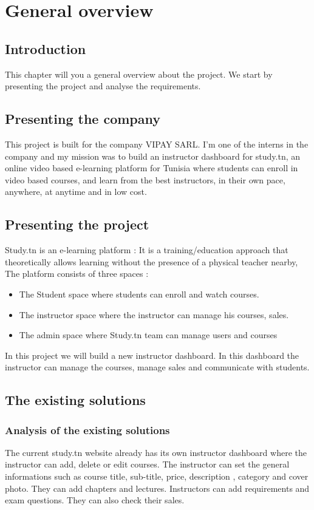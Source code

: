 
\chapter{General overview}
\minitoc
\newpage
\section*{Introduction}
This chapter will you a general overview about the project. We start by presenting the project and analyse the requirements.
\section{Presenting the company}
This project is built for the company VIPAY SARL. I'm one of the interns in the company and
my mission was to build an instructor dashboard for study.tn, an online video based e-learning platform for Tunisia where students can enroll in video based courses, and learn from the best instructors, in their own pace, anywhere, at anytime and in low cost.
\section{Presenting the project}
Study.tn is an e-learning platform : It is a training/education approach that theoretically allows learning without the presence of a physical teacher nearby, 
\hfill \break
\hfill \break
The platform consists of three spaces :

\begin{itemize}
  \item The Student space where students can enroll and watch courses.
  \item The instructor space where the instructor can manage his courses, sales.
  \item The admin space where Study.tn team can manage users and courses 
\end{itemize}

\hfill \break
In this project we will build a new instructor dashboard. In this dashboard the instructor can manage the courses, manage sales and communicate with students.
\section{The existing solutions}
\subsection{Analysis of the existing solutions}
The current study.tn website already has its own instructor dashboard where the instructor can add, delete or edit courses. The instructor can set the general informations such as course title,
sub-title, price, description , category and cover photo. They can add chapters and lectures. Instructors can add requirements and exam questions. They can also check their sales.

